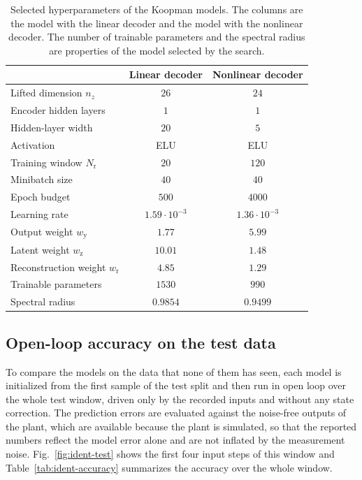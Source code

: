 \documentclass[preprint,12pt,authoryear]{elsarticle}
\theoremstyle{remark}
\begin{document}
\begin{table}[htbp]
  \centering
  \small
  \caption{Selected hyperparameters of the Koopman models. The columns are the model with the linear decoder and the model with the nonlinear decoder. The number of trainable parameters and the spectral radius are properties of the model selected by the search.}
  \label{tab:koopman-hpo}
  \begin{tabular}{lcc}
    \toprule
    & Linear decoder & Nonlinear decoder \\
    \midrule
    Lifted dimension $n_z$ & $26$ & $24$ \\
    Encoder hidden layers & $1$ & $1$ \\
    Hidden-layer width & $20$ & $5$ \\
    Activation & ELU & ELU \\
    Training window $N_\text{r}$ & $20$ & $120$ \\
    Minibatch size & $40$ & $40$ \\
    Epoch budget & $500$ & $4000$ \\
    Learning rate & $1.59 \cdot 10^{-3}$ & $1.36 \cdot 10^{-3}$ \\
    Output weight $w_\text{y}$ & $1.77$ & $5.99$ \\
    Latent weight $w_\text{z}$ & $10.01$ & $1.48$ \\
    Reconstruction weight $w_\text{r}$ & $4.85$ & $1.29$ \\
    \midrule
    Trainable parameters & $1530$ & $990$ \\
    Spectral radius & $0.9854$ & $0.9499$ \\
    \bottomrule
  \end{tabular}
\end{table}

\subsection{Open-loop accuracy on the test data}

To compare the models on the data that none of them has seen, each model is initialized from the first sample of the test split and then run in open loop over the whole test window, driven only by the recorded inputs and without any state correction. The prediction errors are evaluated against the noise-free outputs of the plant, which are available because the plant is simulated, so that the reported numbers reflect the model error alone and are not inflated by the measurement noise. Fig.~\ref{fig:ident-test} shows the first four input steps of this window and Table~\ref{tab:ident-accuracy} summarizes the accuracy over the whole window.
\end{document}
